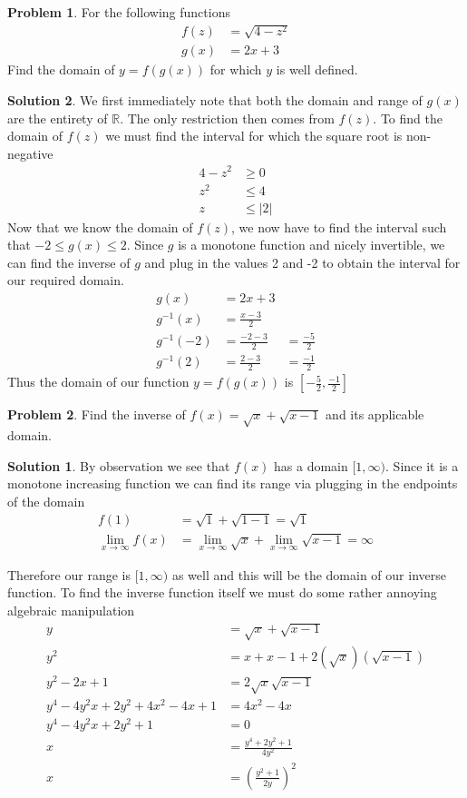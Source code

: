 \documentclass[a4paper]{article}
\theoremstyle{definition}
\newtheorem{problem}{Problem}[section]
\newtheorem*{solution}{Solution}
\begin{document}
\begin{problem}
For the following functions
\begin{align*}
f(z) &= \sqrt{4-z^2} \\
g(x) &= 2x +3
\end{align*}
Find the domain of \(y = f(g(x))\) for which \(y\) is well defined.
\end{problem}
\begin{solution}
We first immediately note that both the domain and range of \(g(x)\) are the entirety of \(\mathbb{R}\). The only restriction then comes from \(f(z)\). To find the domain of \(f(z)\) we must find the interval for which the square root is non-negative
\begin{align*}
4-z^2 &\geq 0 \\
z^2  &\leq 4 \\
z &\leq |2|
\end{align*}
Now that we know the domain of \(f(z)\), we now have to find the interval such that \(-2 \leq g(x) \leq 2\). Since \(g\) is a monotone function and nicely invertible, we can find the inverse of \(g\) and plug in the values 2 and -2 to obtain the interval for our required domain.
\begin{align*}
g(x) &= 2x +3 \\
g^{-1}(x) &= \frac{x-3}{2} \\
g^{-1}(-2) &= \frac{-2 -3}{2} &= \frac{-5}{2} \\
g^{-1}(2) &= \frac{2 -3}{2} &= \frac{-1}{2}
\end{align*}
Thus the domain of our function \(y = f(g(x))\) is \(\left[-\frac{5}{2},\frac{-1}{2}\right]\)

\begin{problem}
Find the inverse of \(f(x) = \sqrt{x} + \sqrt{x-1}\) and its applicable domain.
\end{problem}
\begin{solution}
By observation we see that \(f(x)\) has a domain \([1, \infty)\). Since it is a monotone increasing function we can find its range via plugging in the endpoints of the domain
\begin{align*}
f(1) &= \sqrt{1} + \sqrt{1-1} = \sqrt{1} \\
\lim_{x\to \infty} f(x)&= \lim_{x\to \infty} \sqrt{x} + \lim_{x\to \infty} \sqrt{x-1} = \infty
\end{align*}
\end{solution}
Therefore our range is \([1, \infty)\) as well and this will be the domain of our inverse function. To find the inverse function itself we must do some rather annoying algebraic manipulation
\begin{align*}
y &= \sqrt{x} + \sqrt{x-1} \\
y^2 &= x + x-1 + 2(\sqrt{x})(\sqrt{x-1}) \\
y^2 -2x +1 &= 2\sqrt{x}\sqrt{x-1} \\
y^4 -4y^2x +2y^2 +4x^2 -4x +1 &= 4x^2-4x \\
y^4 -4y^2x +2y^2 +1 &= 0 \\
x &= \frac{y^4 +2y^2 +1}{4y^2} \\
x &= \left(\frac{y^2+1}{2y}\right)^2
\end{align*}
\end{solution}
\end{document}
